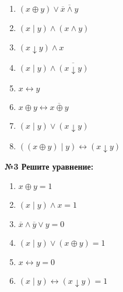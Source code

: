     \begin{minipage}[t]{0.3\textwidth}
        \centering
        \begin{enumerate}
            \item $(x \oplus y) \vee \overline{\overline x \wedge y}$
            \item $(x \mid y) \wedge (x \wedge y)$
            \item $(x \downarrow y) \wedge x$
            \item $(x \mid y) \wedge \overline{(x \downarrow y)}$
        \end{enumerate}
    \end{minipage}
    \begin{minipage}[t]{0.4\textwidth}
        \centering
        \begin{enumerate}
            \setcounter{enumi}{4}
            \item $x \leftrightarrow y$
            \item $x \oplus y \leftrightarrow \overline{x \oplus y}$
            \item $(x \mid y) \vee (x \downarrow y)$
            \item $((x \oplus y) \mid y) \leftrightarrow (x \downarrow y) $
        \end{enumerate}
    \end{minipage}

    \begin{center}
        \textbf{№3 Решите уравнение:}
    \end{center}

    \begin{minipage}[t]{0.3\textwidth}
        \begin{enumerate}
            \item $x \oplus y = 1$
            \item $(x \mid y) \wedge x = 1$
            \item $\overline x \wedge \overline y \vee y = 0$
        \end{enumerate}
    \end{minipage}
    \begin{minipage}[t]{0.4\textwidth}
        \begin{enumerate}
            \setcounter{enumi}{3}
            \item $(x \mid y) \vee (x \oplus y) = 1$
            \item $x \leftrightarrow y = 0$
            \item $(x \mid y) \leftrightarrow (x \downarrow y) = 1$
        \end{enumerate}
    \end{minipage}


